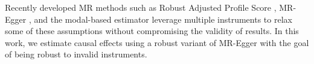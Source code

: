 Recently developed MR methods such as Robust Adjusted Profile Score \cite{zhao2018statistical}, MR-Egger \cite{bowden2015mendelian}, and the modal-based estimator \cite{burgess2018modal} leverage multiple instruments to relax some of these assumptions without compromising the validity of results. In this work, we estimate causal effects using a robust variant of MR-Egger with the goal of being robust to invalid instruments.
